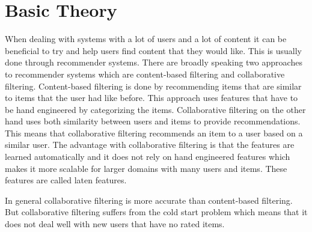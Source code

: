 \section{Basic Theory}
When dealing with systems with a lot of users and a lot of content it can be beneficial to try and help users find content that they would like.
This is usually done through recommender systems.
There are broadly speaking two approaches to recommender systems which are content-based filtering and collaborative filtering.
Content-based filtering is done by recommending items that are similar to items that the user had like before.
This approach uses features that have to be hand engineered by categorizing the items.
Collaborative filtering on the other hand uses both similarity between users and items to provide recommendations. 
This means that collaborative filtering recommends an item to a user based on a similar user.
The advantage with collaborative filtering is that the features are learned automatically and it does not rely on hand engineered features which makes it more scalable for larger domains with many users and items.
These features are called laten features.

In general collaborative filtering is more accurate than content-based filtering.
But collaborative filtering suffers from the cold start problem which means that it does not deal well with new users that have no rated items.

